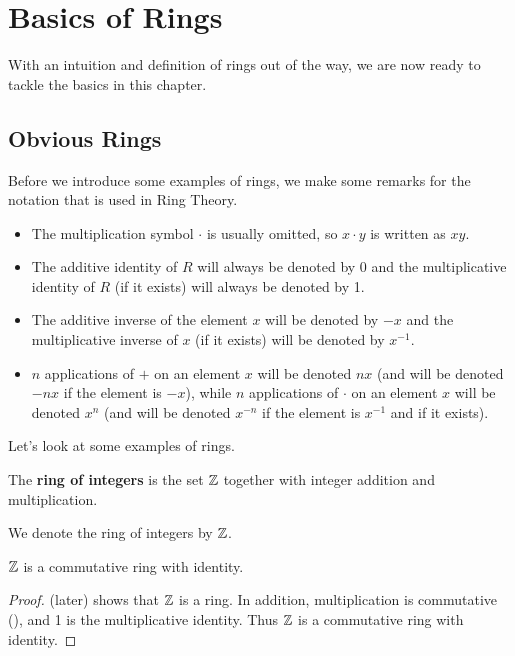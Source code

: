 \chapter{Basics of Rings}
With an intuition and definition of rings out of the way, we are now ready to tackle the basics in this chapter.

\section{Obvious Rings}
Before we introduce some examples of rings, we make some remarks for the notation that is used in Ring Theory.
\begin{itemize}
    \item The multiplication symbol $\cdot$ is usually omitted, so $x \cdot y$ is written as $xy$.
    \item The additive identity of $R$ will always be denoted by 0 and the multiplicative identity of $R$ (if it exists) will always be denoted by 1.
    \item The additive inverse of the element $x$ will be denoted by $-x$ and the multiplicative inverse of $x$ (if it exists) will be denoted by $x^{-1}$.
    \item $n$ applications of $+$ on an element $x$ will be denoted $nx$ (and will be denoted $-nx$ if the element is $-x$), while $n$ applications of $\cdot$ on an element $x$ will be denoted $x^n$ (and will be denoted $x^{-n}$ if the element is $x^{-1}$ and if it exists).
\end{itemize}

Let's look at some examples of rings.
\begin{definition}
    The \textbf{ring of integers} is the set $\mathbb{Z}$ together with integer addition and multiplication.
\end{definition}
\begin{remark}
    We denote the ring of integers by $\mathbb{Z}$.
\end{remark}
\begin{proposition}
    $\mathbb{Z}$ is a commutative ring with identity.
\end{proposition}
\begin{proof}
     (later) shows that $\mathbb{Z}$ is a ring. In addition, multiplication is commutative (), and 1 is the multiplicative identity. Thus $\mathbb{Z}$ is a commutative ring with identity.
\end{proof}

